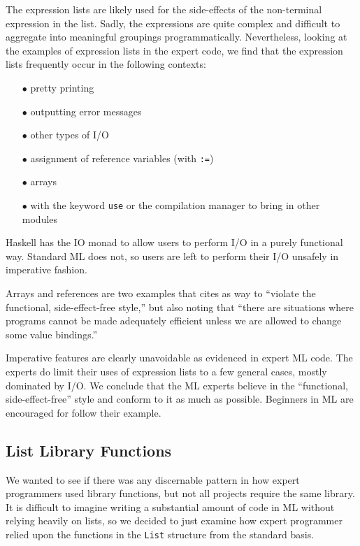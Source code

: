 \documentclass[12pt,abstracton]{scrartcl}
\begin{document}
The expression lists are likely used for the side-effects of the non-terminal
expression in the list. Sadly, the expressions are quite complex and difficult
to aggregate into meaningful groupings programmatically. Nevertheless,
looking at the examples of expression lists in the expert code, we find that
the expression lists frequently occur in the following contexts:
\begin{itemize}
\item[$\bullet$] pretty printing
\item[$\bullet$] outputting error messages
\item[$\bullet$] other types of I/O
\item[$\bullet$] assignment of reference variables (with \texttt{:=})
\item[$\bullet$] arrays
\item[$\bullet$] with the keyword \texttt{use} or the compilation manager to bring in other modules
\end{itemize}

Haskell has the IO monad to allow users to perform I/O in a purely functional way. \cite{Jon93}
Standard ML does not, so users are left to perform their
I/O unsafely in imperative fashion.

Arrays and references are two examples that \cite{Ull98} cites as way to ``violate the functional,
side-effect-free style,'' but also noting that ``there are situations where programs cannot
be made adequately efficient unless we are allowed to change some value bindings.''

Imperative features are clearly unavoidable as evidenced in expert ML code. The experts do
limit their uses of expression lists to a few general cases, mostly dominated by I/O.
We conclude that the ML experts believe in the ``functional, side-effect-free'' style
and conform to it as much as possible. Beginners in ML are encouraged for follow their example.
\subsection{List Library Functions}\label{subsec:list}
We wanted to see if there was any discernable pattern in how expert programmers
used library functions, but not all projects require the same library.
It is difficult to imagine writing a substantial amount of code in ML without
relying heavily on lists, so we decided to just examine how expert programmer relied upon the functions
in the \texttt{List} structure from the standard basis.
\end{document}
